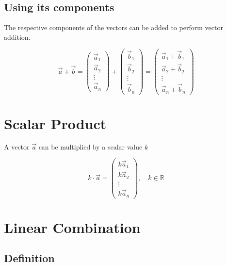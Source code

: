 \documentclass[a4paper]{article}
\begin{document}
\subsection{Using its components}

The respective components of the vectors can be added to perform vector addition.

\[
    \vec{a} + \vec{b} =
    \begin{pmatrix}
        \vec{a}_1 \\
        \vec{a}_2 \\
        \vdots \\
        \vec{a}_n
    \end{pmatrix}
    +
    \begin{pmatrix}
        \vec{b}_1 \\
        \vec{b}_2 \\
        \vdots \\
        \vec{b}_n
    \end{pmatrix}
    =
    \begin{pmatrix}
        \vec{a}_1 + \vec{b}_1 \\
        \vec{a}_2 + \vec{b}_2\\
        \vdots \\
        \vec{a}_n + \vec{b}_n
    \end{pmatrix}
\]

\pagebreak

\section{Scalar Product}

A vector \(\vec{a}\) can be multiplied by a scalar value \(k\)

\[
    k\cdot\vec{a} =
    \begin{pmatrix}
        k \vec{a}_1 \\
        k \vec{a}_2 \\
        \vdots \\
        k \vec{a}_n
    \end{pmatrix},
    \quad k\in\mathbb{R}
\]


\section{Linear Combination}

%
%
%
%
%
%

\subsection{Definition}
\end{document}
